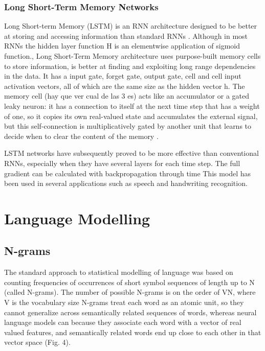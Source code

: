 \subsubsection{Long Short-Term Memory Networks}
Long Short-term Memory (LSTM) is an RNN architecture designed to be better at storing and accessing information than standard RNNs \cite{graves2013generating}.
Although in most RNNs the hidden layer function H is an elementwise application of sigmoid function.,  Long Short-Term Memory  architecture uses purpose-built memory cells to store information, is better at finding and exploiting long range dependencies in the data. It has a input gate, forget gate, output gate, cell and cell input activation vectors, all of which are the same size as the hidden vector h. \cite{graves2013generating}
The memory cell (hay que ver cual de las 3 es) acts like an accumulator or a gated leaky neuron: it has a connection to itself at the next time step that has a weight of one, so it copies its own real-valued state and accumulates the external signal, but this self-connection is multiplicatively gated by another unit that learns to decide when to clear the content of the memory \cite{lecun2015deep}.

LSTM networks have subsequently proved to be more effective than conventional RNNs, especially when they have several layers for each time step\cite{lecun2015deep}.
The full gradient can be calculated with backpropagation through time \cite{graves2013generating}
This model has been used in several applications such as speech and handwriting recognition.\cite{graves2013generating}



\section{Language Modelling}
\subsection{N-grams}
The standard approach to statistical modelling of language was based on counting frequencies of occurrences of short symbol sequences of length up to N (called N-grams). The number of possible N-grams is on the order of VN, where V is the vocabulary size N-grams treat each word as an atomic unit, so they cannot generalize across semantically related sequences of words, whereas neural language models can because they associate each word with a vector of real valued features, and semantically related words end up close to each other in that vector space (Fig. 4).\cite{lecun2015deep}

